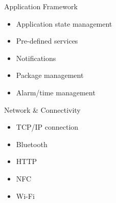 \documentclass[presentation,aspectratio=43,12pt]{beamer}
\begin{document}
\begin{frame}[label=sec-3-4]{Application Framework}
\begin{itemize}
\item Application state management
\item Pre-defined services
\item Notifications
\item Package management
\item Alarm/time management
\end{itemize}

\end{frame}
\begin{frame}[label=sec-3-5]{Network \& Connectivity}
\begin{itemize}
\item TCP/IP connection
\item Bluetooth
\item HTTP
\item NFC
\item Wi-Fi
\end{itemize}

\end{frame}
\end{document}

